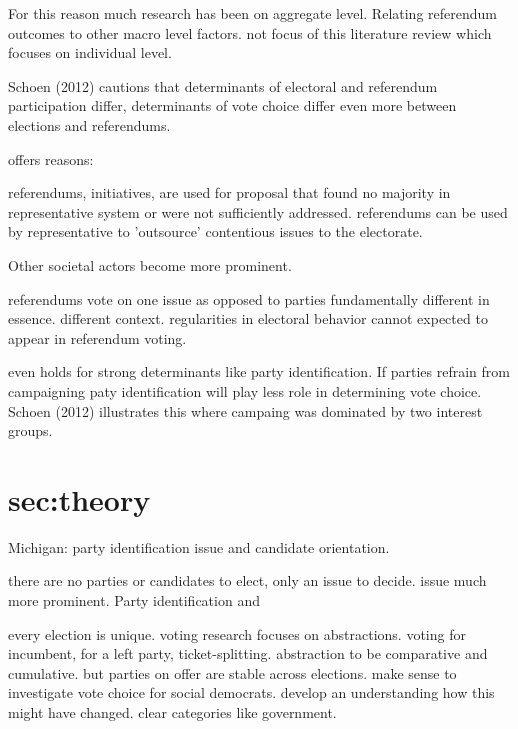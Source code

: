 \documentclass[11pt,a4paper]{article}
\begin{document}
	For this reason much research has been on aggregate level. Relating referendum outcomes to other macro level factors. not focus of this literature review which focuses on individual level.
	
	Schoen (2012) cautions that determinants of electoral and referendum participation differ, determinants of vote choice differ even more between elections and referendums. 
	
	offers reasons:
	

referendums, initiatives, are used for proposal that found no majority in representative system or were not sufficiently addressed. referendums can be used by representative to 'outsource' contentious issues to the electorate. 

Other societal actors become more prominent. 

referendums vote on one issue as opposed to parties fundamentally different in essence. different context. regularities in electoral behavior cannot expected to appear in referendum voting.

even holds for strong determinants like party identification. If parties refrain from campaigning paty identification will play less role in determining vote choice. Schoen (2012) illustrates this where campaing was dominated by two interest groups.

\section{sec:theory}

Michigan: party identification issue and candidate orientation. 

there are no parties or candidates to elect, only an issue to decide. issue much more prominent. Party identification and 

every election is unique. voting research focuses on abstractions. voting for incumbent, for a left party, ticket-splitting. abstraction to be comparative and cumulative. but parties on offer are stable across elections. make sense to investigate vote choice for social democrats. develop an understanding how this might have changed. clear categories like government.
\end{document}
